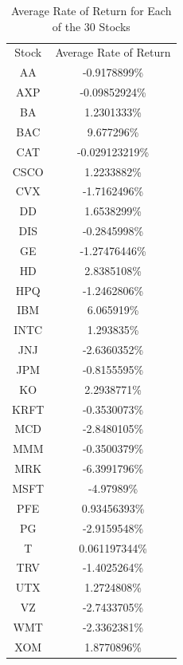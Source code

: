 \documentclass[12pt,journal,compsoc]{IEEEtran}
\begin{document}
\begin{table}
    \caption{{Average Rate of Return for Each of the 30 Stocks}} 
    \label{avg-rates-of-return-table}
    \begin{tabular}{ c c }
        Stock & Average Rate of Return \\ 
        AA & -0.9178899\% \\ %
        AXP & -0.09852924\% \\ %
        BA & 1.2301333\% \\ %
        BAC & 9.677296\% \\ %
        CAT & -0.029123219\% \\ %
        CSCO & 1.2233882\% \\ %
        CVX & -1.7162496\% \\ %
        DD & 1.6538299\% \\ %
        DIS & -0.2845998\% \\ %
        GE & -1.27476446\% \\ %
        HD & 2.8385108\% \\ %
        HPQ & -1.2462806\% \\ %
        IBM & 6.065919\% \\ %
        INTC & 1.293835\% \\ %
        JNJ & -2.6360352\% \\ %
        JPM & -0.8155595\% \\ %
        KO & 2.2938771\% \\ %
        KRFT & -0.3530073\% \\ %
        MCD & -2.8480105\% \\ %
        MMM & -0.3500379\% \\ %
        MRK & -6.3991796\% \\ %
        MSFT & -4.97989\% \\ %
        PFE & 0.93456393\% \\ %
        PG & -2.9159548\% \\ %
        T & 0.061197344\% \\ %
        TRV & -1.4025264\% \\ %
        UTX & 1.2724808\% \\ %
        VZ & -2.7433705\% \\ %
        WMT & -2.3362381\% \\ %
        XOM & 1.8770896\% \\ %
    \end{tabular}
\end{table}
  
\end{document}

